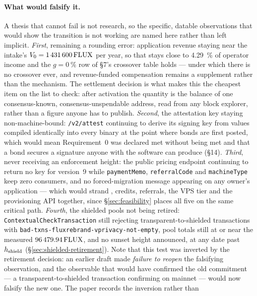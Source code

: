 \paragraph{What would falsify it.}
A thesis that cannot fail is not research, so the specific, datable observations that would show the
transition is not working are named here rather than left implicit. \emph{First}, \PNR remaining a
rounding error: application revenue staying near the intake's $V_0 = \num{1431600}\,\mathrm{FLUX}$ per year, so
that \PNR stays close to \SI{4.29}{\percent} of operator income and the $g = \SI{0}{\percent}$ row of
\S7's crossover table holds --- under which there is no crossover ever, and revenue-funded
compensation remains a supplement rather than the mechanism. The settlement decision is what makes
this the cheapest item on the list to check: after activation the quantity is the balance of one
consensus-known, consensus-unspendable address, read from any block explorer, rather than a figure
anyone has to publish. \emph{Second}, the attestation key staying non-machine-bound:
\texttt{/v2/attest} continuing to derive its signing key from values compiled identically into every
binary at the point where bonds are first posted, which would mean Requirement~0 was declared met
without being met and that a bond secures a signature anyone with the software can produce
(\S14). \emph{Third},  never receiving an enforcement height: the public pricing endpoint
continuing to return no key for version~9 while \texttt{paymentMemo}, \texttt{referralCode} and
\texttt{machineType} keep zero consumers, and no forced-migration message appearing on any owner's
application --- which would strand \PNR, credits, referrals, the VPS tier and the provisioning API
together, since \S\ref{sec:feasibility} places all five on the same critical path. \emph{Fourth}, the shielded pools not
being retired: \texttt{Contextual\allowbreak{}Check\allowbreak{}Transaction} still rejecting transparent-to-shielded
transactions with \texttt{bad-\allowbreak{}txns-\allowbreak{}fluxrebrand-\allowbreak{}vprivacy-\allowbreak{}not-\allowbreak{}empty}, pool totals still at or near the
measured $\num{96479.94}\,\mathrm{FLUX}$, and no sunset height announced, at any date past
$h_{\mathrm{shield}}$ (\S\ref{sec:shielded-retirement}). Note that this test was inverted by the
retirement decision: an earlier draft made \emph{failure to reopen} the falsifying observation, and
the observable that would have confirmed the old commitment --- a transparent-to-shielded transaction
confirming on mainnet --- would now falsify the new one. The paper records the inversion rather than
